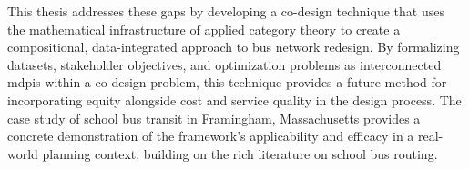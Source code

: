 This thesis addresses these gaps by developing a co-design technique that uses the mathematical infrastructure of applied category theory to create a compositional, data-integrated approach to bus network redesign. By formalizing datasets, stakeholder objectives, and optimization problems as interconnected \glspl{mdpi} within a co-design problem, this technique provides a future method for incorporating equity alongside cost and service quality in the design process. The case study of school bus transit in Framingham, Massachusetts provides a concrete demonstration of the framework's applicability and efficacy in a real-world planning context, building on the rich literature on school bus routing.